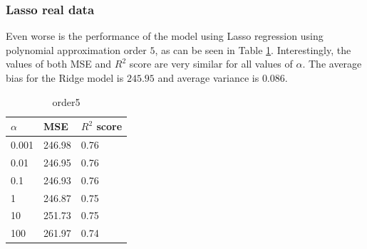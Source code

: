 \documentclass [11pt]{article}
\begin{document}
\subsubsection{Lasso real data}
Even worse is the performance of the model using Lasso regression using polynomial approximation order $5$, as can be seen in Table \ref{tab:ridge5Terrain}. Interestingly, the values of both MSE and $R^{2}$ score are very similar for all values of $\alpha$. The average bias for the Ridge model is $245.95$ and average variance is $0.086$.
\begin{table}[H]
\centering
\begin{tabular}{lll}
\hline
$\alpha$ & MSE    & $R^{2}$ score \\ \hline
0.001     & 246.98 & 0.76          \\
0.01      & 246.95 & 0.76          \\
0.1       & 246.93 & 0.76         \\
1         & 246.87 & 0.75          \\
10        & 251.73 & 0.75          \\
100       & 261.97 & 0.74          \\ \hline
\end{tabular}
\caption{order5}
\label{tab:ridge5Terrain}
\end{table}
\end{document}
